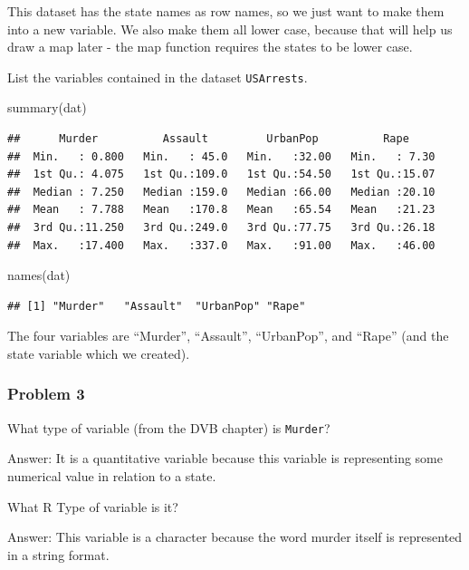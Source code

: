 \documentclass[
]{article}
\newenvironment{Shaded}{\begin{snugshade}}{\end{snugshade}}
\newcommand{\FunctionTok}[1]{\textcolor[rgb]{0.00,0.00,0.00}{#1}}
\newcommand{\NormalTok}[1]{#1}
\begin{document}
This dataset has the state names as row names, so we just want to make
them into a new variable. We also make them all lower case, because that
will help us draw a map later - the map function requires the states to
be lower case.

List the variables contained in the dataset \texttt{USArrests}.

\begin{Shaded}
\begin{Highlighting}[]
\FunctionTok{summary}\NormalTok{(dat)}
\end{Highlighting}
\end{Shaded}

\begin{verbatim}
##      Murder          Assault         UrbanPop          Rape      
##  Min.   : 0.800   Min.   : 45.0   Min.   :32.00   Min.   : 7.30  
##  1st Qu.: 4.075   1st Qu.:109.0   1st Qu.:54.50   1st Qu.:15.07  
##  Median : 7.250   Median :159.0   Median :66.00   Median :20.10  
##  Mean   : 7.788   Mean   :170.8   Mean   :65.54   Mean   :21.23  
##  3rd Qu.:11.250   3rd Qu.:249.0   3rd Qu.:77.75   3rd Qu.:26.18  
##  Max.   :17.400   Max.   :337.0   Max.   :91.00   Max.   :46.00
\end{verbatim}

\begin{Shaded}
\begin{Highlighting}[]
\FunctionTok{names}\NormalTok{(dat)}
\end{Highlighting}
\end{Shaded}

\begin{verbatim}
## [1] "Murder"   "Assault"  "UrbanPop" "Rape"
\end{verbatim}

The four variables are ``Murder'', ``Assault'', ``UrbanPop'', and
``Rape'' (and the state variable which we created).

\hypertarget{problem-3}{%
\subsubsection{Problem 3}\label{problem-3}}

What type of variable (from the DVB chapter) is \texttt{Murder}?

Answer: It is a quantitative variable because this variable is
representing some numerical value in relation to a state.

What R Type of variable is it?

Answer: This variable is a character because the word murder itself is
represented in a string format.
\end{document}
